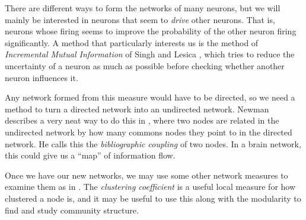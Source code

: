 \documentclass[a4paper,12pt]{report}
\begin{document}
There are different ways to form the networks of many neurons, but we will 
mainly be interested in neurons that seem to {\sl drive} other neurons.  That 
is, neurons whose firing seems to improve the probability of the other neuron 
firing significantly.  A method that particularly interests us is the method of 
{\sl Incremental Mutual Information} of Singh and Lesica 
\cite{SinghLesica2010a}, which tries to reduce the uncertainty of a neuron as 
much as possible before checking whether another neuron influences it.

Any network formed from this measure would have to be directed, so we need a 
method to turn a directed network into an undirected network.  Newman describes 
a very neat way to do this in \cite{Newman2010a}, where two nodes are related 
in the undirected network by how many commons nodes they point to in the 
directed network.  He calls this the {\sl bibliographic coupling} of two 
nodes.  In a brain network, this could give us a ``map'' of information flow.

Once we have our new networks, we may use some other network measures to 
examine them as in \cite{RubinovSporns2010a}.  The {\sl clustering coefficient} 
is a useful local measure for how clustered a node is, and it may be useful to 
use this along with the modularity to find and study community structure.




\end{document}
